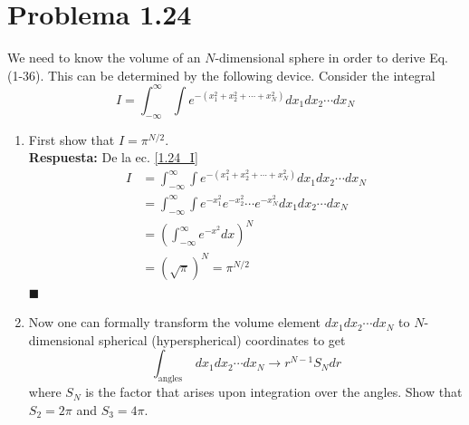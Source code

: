 \documentclass[]{article}
\numberwithin{equation}{section}
\newcommand{\0}{\textcolor{gray}{0}}
\newcommand{\qed}{\hfill\(\blacksquare\)}
\begin{document}

\section{Problema 1.24}
We need to know the volume of an $N$-dimensional sphere in order to derive Eq. (1-36). This can be determined by the following device. Consider the integral
\begin{equation}
	I=\int_{-\infty}^{\infty} \int e^{-\left(x_1^2+x_2^2+\cdots+x_N^2\right)} d x_1 d x_2 \cdots d x_N
	\label{1.24_I}
\end{equation}

\begin{enumerate}
	\item[a.] First show that $I = \pi^{N / 2}$.
	\\
	
	\textbf{Respuesta:}
	De la ec. \ref{1.24_I}
	\begin{align}
		I &= \int_{-\infty}^{\infty} \int e^{-\left(x_1^2+x_2^2+\cdots+x_N^2\right)} d x_1 d x_2 \cdots d x_N\nonumber\\
		&= \int_{-\infty}^{\infty} \int e^{-x_1^2}e^{-x_2^2}\cdots e^{-x_N^2} d x_1 d x_2 \cdots d x_N\nonumber\\
		&= \left(\int_{-\infty}^{\infty}e^{-x^2}dx\right)^N\nonumber\\
		&= \left(\sqrt{\pi}\right)^N = \pi^{N/2}\label{1.24_I_pi}
	\end{align}
	\qed

	\item[b.] Now one can formally transform the volume element $d x_1 d x_2 \cdots d x_N$ to $N$-dimensional spherical (hyperspherical) coordinates to get
	\begin{equation}
		\int_{\text {angles }} d x_1 d x_2 \cdots d x_N \rightarrow r^{N-1} S_N d r
	\end{equation}
	where $S_N$ is the factor that arises upon integration over the angles. Show that $S_2 = 2 \pi$ and $S_3=4 \pi$.
	\\
	

\end{enumerate}
\end{document}
